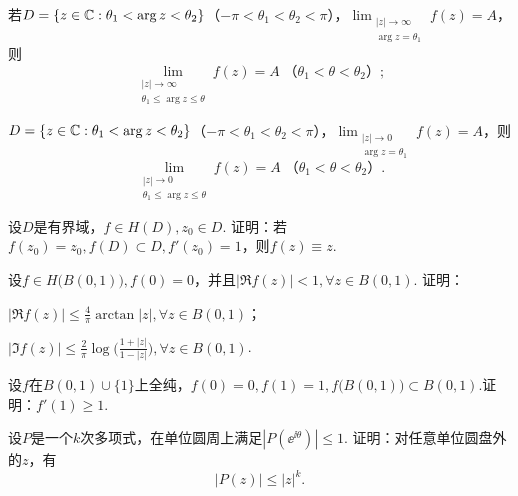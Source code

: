 \begin{xiti}
\begin{enuma}
\[          \]
      \item 若$D=\{z\in \mathbb C:\theta_1<\arg z<\theta_2\}$（$-\pi<\theta_1<\theta_2<\pi$），$\lim_{\substack{|z|\to\infty\\
      \arg z=\theta_1}}f(z)=A$，则
      \[\lim_{\substack{|z|\to\infty\\\theta_1\le\arg z\le\theta}}f(z)=A\;\mbox{（$\theta_1<\theta<\theta_2$）};\]
      \item $D=\{z\in \mathbb C:\theta_1<\arg z<\theta_2\}$（$-\pi<\theta_1<\theta_2<\pi$），$\lim_{\substack{|z|\to0\\
      \arg z=\theta_1}}f(z)=A$，则
      \[\lim_{\substack{|z|\to0\\\theta_1\le\arg z\le\theta}}f(z)=A\;\mbox{（$\theta_1<\theta<\theta_2$）}.\]
    \end{enuma}
  \item 设$D$是有界域，$f\in H(D),z_0\in D$. 证明：若$f(z_0)=z_0,f(D)\subset D,f'(z_0)=1$，则$f(z)\equiv z$.
  \item 设$f\in H\big(B(0,1)\big),f(0)=0$，并且$|\Re f(z)|<1,\forall z\in B(0,1)$. 证明：
    \begin{enuma}
      \item $|\Re f(z)|\le\frac4\pi\arctan|z|,\forall z\in B(0,1)$；
      \item $|\Im f(z)|\le\frac2\pi\log\bigg(\frac{1+|z|}{1-|z|}\bigg),\forall z\in B(0,1)$.
    \end{enuma}
  \item 设$f$在$B(0,1)\cup\{1\}$上全纯，$f(0)=0,f(1)=1,f\big(B(0,1)\big)\subset B(0,1)$.证明：$f'(1)\ge1$.
  \item 设$P$是一个$k$次多项式，在单位圆周上满足$|P(\ee^{\ii\theta})|\le1$. 证明：对任意单位圆盘外的$z$，有
      \[
        |P(z)|\le |z|^k.
      \]
\end{xiti}
